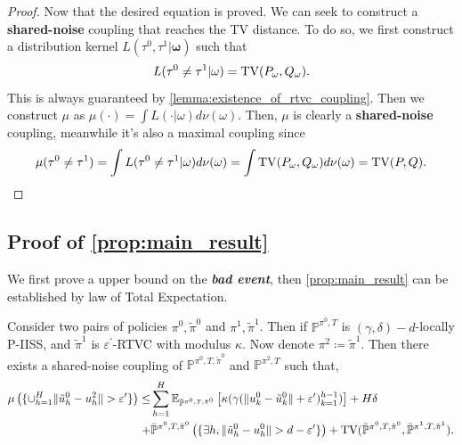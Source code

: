 \documentclass{article}
\begin{document}
\begin{proof}
Now that the desired equation is proved. We can seek to construct a \textbf{shared-noise} coupling that reaches the TV distance. To do so, we first construct a distribution kernel $L(\tau^0,\tau^1|\bm \omega)$ such that 
    \begin{equation*}
        L(\tau^0 \neq \tau^1|\omega)=\textnormal{TV}(P_\omega, Q_\omega).
    \end{equation*}
This is always guaranteed by \cref{lemma:existence_of_rtvc_coupling}. Then we construct $\mu$ as $\mu(\cdot)=\int L(\cdot|\omega)d\nu(\omega)$. Then, $\mu$ is clearly a \textbf{shared-noise} coupling, meanwhile it's also a maximal coupling since
\begin{equation*}
     \mu(\tau^0\neq \tau^1)=\int L(\tau^0\neq \tau^1|\omega) d\nu(\omega)=\int \text{TV}(P_\omega, Q_\omega)d\nu(\omega)=\text{TV}(P,Q). \qedhere
\end{equation*}

\end{proof}




\subsection{Proof of \texorpdfstring{\cref{prop:main_result}}{Theorem 1}}

We first prove a upper bound on the \textbf{\emph{bad event}}, then \cref{prop:main_result} can be established by law of Total Expectation.
\begin{lemma}\label{lemma:controlling_bad_event}
Consider two pairs of policies $\pi^0,\tilde \pi^0$ and $\pi^1,\tilde \pi^1$. 
Then if $\mathbb P^{\pi^0, T}$ is $(\gamma,\delta)-d$-locally P-IISS, and $\tilde \pi^1$ is $\varepsilon^\prime$-RTVC with modulus $\kappa$. 
Now denote $\pi^2\coloneqq \tilde \pi^1$. Then there exists a shared-noise coupling of $\mathbb P^{\pi^0, T,\tilde \pi^0}$ and $\mathbb P^{\pi^2, T}$ such that,
\begin{equation}\label{eq:bound_of_misbehave_probability}
    \begin{aligned}
                \mu\left(\{\cup_{h=1}^H \|\tilde u_h^0-u_h^2\|>\varepsilon^\prime\}\right)\leq &\sum_{h=1}^H \mathbb E_{\bar{\mathbb P}^{\pi^0, T,\tilde \pi^0}}\left[\kappa(\gamma(\|u_k^0-\tilde u_k^0\|+\varepsilon^\prime)_{k=1}^{h-1})\right]
        +H\delta\\
        +&\bar {\mathbb P}^{\pi^0, T, \tilde \pi^0}\left(\{\exists h, \|\tilde u_h^0-u_h^0\|>d-\varepsilon^\prime\}\right)+\textnormal{TV}(\bar {\mathbb P}^{\pi^0,T,\tilde \pi^0},\bar {\mathbb P}^{\pi^1,T,\tilde \pi^1}).
    \end{aligned}
\end{equation}
\end{lemma}
\end{document}
